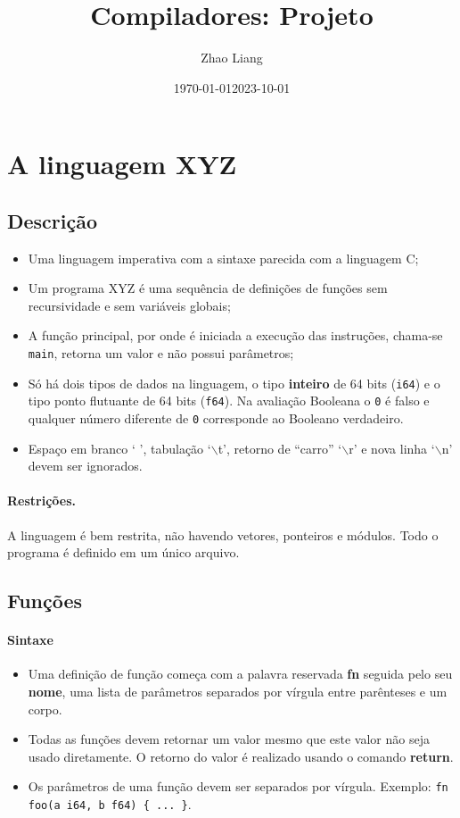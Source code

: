 \documentclass{article}
\date{\today}
\title{Compiladores: Projeto}
\author{Zhao Liang}
\date{2023-10-01}
\def\lang{{\sc XYZ}}
\begin{document}
\maketitle

\section{A linguagem \lang}

\subsection{Descrição}

\begin{itemize}
\item Uma linguagem imperativa com a sintaxe parecida com a 
linguagem C;
\item Um programa \lang{} é uma sequência de definições de 
funções sem recursividade e sem variáveis globais;
\item A função principal, por onde é iniciada a execução 
das instruções, chama-se {\tt main}, retorna um valor e 
não possui parâmetros;
\item Só há dois tipos de dados na linguagem, o tipo {\bf inteiro}
	de 64 bits ({\tt i64}) e o tipo ponto flutuante de 
	64 bits ({\tt f64}). Na avaliação Booleana o {\tt 0} é falso 
	e qualquer número diferente de {\tt 0} corresponde ao Booleano verdadeiro.
\item  Espaço em branco ` ', tabulação `$\backslash$t', 
   retorno de ``carro'' `$\backslash$r' e nova linha
`$\backslash$n' devem ser ignorados.
\end{itemize}

\paragraph{Restrições.} A linguagem é bem restrita, não havendo 
vetores, ponteiros e módulos. Todo o programa é definido em um 
único arquivo.

\subsection{Funções}

\paragraph{Sintaxe}
\begin{itemize}
    \item Uma definição de função começa com a palavra reservada 
    {\bf fn} seguida pelo seu {\bf nome}, uma lista de parâmetros 
    separados por vírgula entre parênteses e um corpo.
    \item Todas as funções devem retornar um valor mesmo que este 
    valor não seja usado diretamente. O retorno do valor é realizado 
    usando o comando {\bf return}.
    \item Os parâmetros de uma função devem ser separados por vírgula.
	    Exemplo: {\tt fn foo(a i64, b f64) \{ ... \}}.
\end{itemize}
\end{document}
